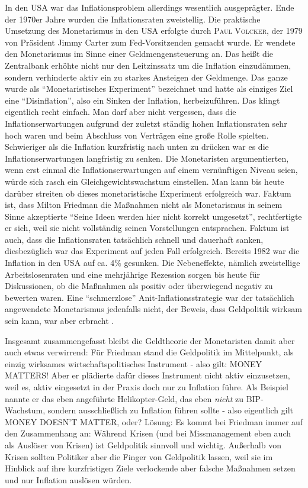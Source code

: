 In den USA war das Inflationsproblem allerdings wesentlich ausgeprägter. Ende der 1970er Jahre wurden die Inflationsraten zweistellig. Die praktische Umsetzung des Monetarismus in den USA erfolgte durch \textsc{Paul Volcker}, der 1979 von Präsident Jimmy Carter zum Fed-Vorsitzenden gemacht wurde. Er wendete den Monetarismus im Sinne einer Geldmengensteuerung an. Das heißt die Zentralbank erhöhte nicht nur den Leitzinssatz um die Inflation einzudämmen, sondern verhinderte aktiv ein zu starkes Ansteigen der Geldmenge. Das ganze wurde als "`Monetaristisches Experiment"' bezeichnet und hatte als einziges Ziel eine "`Disinflation"', also ein Sinken der Inflation, herbeizuführen. Das klingt eigentlich recht einfach. Man darf aber nicht vergessen, dass die Inflationserwartungen aufgrund der zuletzt ständig hohen Inflationsraten sehr hoch waren und beim Abschluss von Verträgen eine große Rolle spielten. Schwieriger als die Inflation kurzfristig nach unten zu drücken war es die Inflationserwartungen langfristig zu senken. Die Monetaristen argumentierten, wenn erst einmal die Inflationserwartungen auf einem vernünftigen Niveau seien, würde sich rasch ein Gleichgewichtswachstum einstellen. Man kann bis heute darüber streiten ob dieses monetaristische Experiment erfolgreich war. Faktum ist, dass Milton Friedman die Maßnahmen nicht als Monetarismus in seinem Sinne akzeptierte "`Seine Ideen werden hier nicht korrekt umgesetzt"', rechtfertigte er sich, weil sie nicht vollständig seinen Vorstellungen entsprachen\parencite{Kremer2018}. Faktum ist auch, dass die Inflationsraten tatsächlich schnell und dauerhaft sanken, diesbezüglich war das Experiment auf jeden Fall erfolgreich. Bereits 1982 war die Inflation in den USA auf ca. 4\% gesunken. Die Nebeneffekte, nämlich zweistellige Arbeitslosenraten und eine mehrjährige Rezession sorgen bis heute für Diskussionen, ob die Maßnahmen als positiv oder überwiegend negativ zu bewerten waren. Eine "`schmerzlose"' Anit-Inflationsstrategie war der tatsächlich angewendete Monetarismus jedenfalls nicht, der Beweis, dass Geldpolitik wirksam sein kann, war aber erbracht \parencite[S. 703]{Samuelson1998}.

Insgesamt zusammengefasst bleibt die Geldtheorie der Monetaristen damit aber auch etwas verwirrend: Für Friedman stand die Geldpolitik im Mittelpunkt, als einzig wirksames wirtschaftspolitisches Instrument  - also gilt: MONEY MATTERS! Aber er plädierte dafür dieses Instrument nicht aktiv einzusetzen, weil es, aktiv eingesetzt in der Praxis doch nur zu Inflation führe. Als Beispiel nannte er das eben angeführte Helikopter-Geld, das eben \textit{nicht} zu BIP-Wachstum, sondern ausschließlich zu Inflation führen sollte - also eigentlich gilt MONEY DOESN'T MATTER, oder? Lösung: Es kommt bei Friedman immer auf den Zusammenhang an: Während Krisen (und bei Missmanagement eben auch als Auslöser von Krisen) ist Geldpolitik sinnvoll und wichtig. Außerhalb von Krisen sollten Politiker aber die Finger von Geldpolitik lassen, weil sie im Hinblick auf ihre kurzfristigen Ziele verlockende aber falsche Maßnahmen setzen und nur Inflation auslösen würden. 

